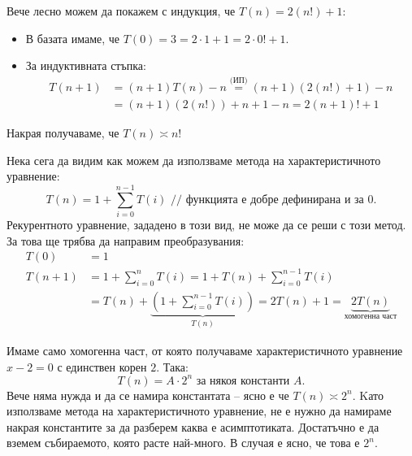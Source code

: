 Вече лесно можем да покажем с индукция, че $T(n) = 2(n!) + 1$:
\begin{itemize}
    \item В базата имаме, че $T(0) = 3 = 2 \cdot 1 + 1 = 2 \cdot 0! + 1$.
    \item За индуктивната стъпка:
          \begin{align*}
              T(n + 1) & = (n + 1)T(n) - n \stackrel{\text{(ИП)}}{=} (n + 1)(2(n!) + 1) - n \\
                       & = (n + 1)(2(n!)) + n + 1 - n = 2(n + 1)! + 1
          \end{align*}
\end{itemize}
Накрая получаваме, че $T(n) \asymp n!$

Нека сега да видим как можем да използваме метода на характеристичното уравнение:
\[
    T(n) = 1 + \sum\limits_{i = 0}^{n - 1}T(i)    \text{ // функцията е добре дефинирана и за } 0.
\]
Рекурентното уравнение, зададено в този вид, не може да се реши с този метод.
За това ще трябва да направим преобразувания:
\begin{align*}
    T(0)     & = 1                                                                                                                                      \\
    T(n + 1) & = 1 + \sum\limits_{i = 0}^{n}T(i) = 1 + T(n) + \sum\limits_{i = 0}^{n - 1}T(i)                                                           \\
             & = T(n) + \underbrace{\left( 1 + \sum\limits_{i = 0}^{n - 1}T(i) \right)}_{T(n)} = 2T(n) + 1 = \underbrace{2T(n)}_{\text{хомогенна част}}
\end{align*}

Имаме само хомогенна част, от която получаваме характеристичното уравнение $x - 2 = 0$ с единствен корен $2$.
Така:
\[
    T(n) = A \cdot 2^n \text{ за някоя константи } A.
\]
Вече няма нужда и да се намира константата -- ясно е че $T(n) \asymp 2^n$.
Kато използваме метода на характеристичното уравнение, не е нужно да намираме накрая константите за да разберем каква е асимптотиката.
Достатъчно е да вземем събираемото, която расте най-много. В случая е ясно, че това е $2^n$.

\newpage


